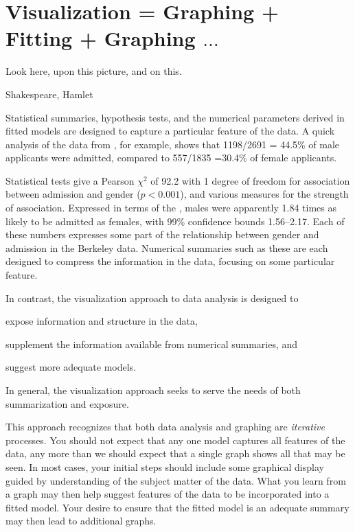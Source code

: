 \documentclass[11pt]{book}
\begin{document}
\section{Visualization = Graphing + Fitting + Graphing $\dots$}\label{sec:vis}
\epigraph{Look here, upon this picture, and on this.}{Shakespeare, Hamlet}

Statistical summaries, hypothesis tests, and the numerical parameters
derived in fitted models are designed to capture a particular feature of the
data.  A quick analysis of the data from , for example,
shows that 
1198/2691 = 44.5\% of male applicants were admitted, compared to
557/1835 =30.4\% of female applicants. 

Statistical tests 
give a Pearson $\chi^2$ of 92.2
with 1 degree of freedom
for association between admission and gender ($p < 0.001$), and
various measures for the strength of association.
% 
Expressed in terms of the , males were apparently
1.84 times as likely
to be admitted as females, with 99\% confidence bounds
1.56--2.17.
Each of these numbers expresses some part of the relationship between
gender and admission in the Berkeley data.
Numerical summaries such as these are each
designed to compress the information in the data, focusing on some particular
feature.

In contrast, the visualization approach to data analysis is designed
to 
\begin{seriate}
\item expose information and structure in the data,
\item supplement the information available from numerical summaries, and 
\item suggest more adequate models.
\end{seriate}
In general, the visualization approach seeks to serve the needs of
both summarization and exposure.

This approach recognizes that both data analysis and graphing are
\emph{iterative} processes.
You should not expect that any one model captures all features of the
data, any more than we should expect that a single graph shows all that
may be seen.  In most cases, your initial steps should include some
graphical display guided by understanding of the subject matter
of the data.
What you learn from a graph may then help suggest features of the data
to be incorporated into a fitted model.
Your desire to ensure that the fitted model is an adequate summary
may then lead to additional graphs.
\end{document}
